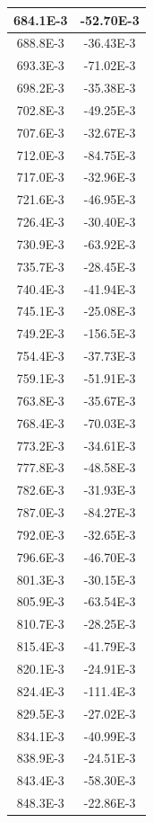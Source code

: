 \documentclass[english, 12pt, a4paper]{ifimaster}
\begin{document}
\begin{appendices}
\begin{center}
\begin{longtable}[htbp]{|c|c|}
\hline
  684.1E-3 & -52.70E-3 \\
\hline
  688.8E-3 & -36.43E-3 \\
\hline
  693.3E-3 & -71.02E-3 \\
\hline
  698.2E-3 & -35.38E-3 \\
\hline
  702.8E-3 & -49.25E-3 \\
\hline
  707.6E-3 & -32.67E-3 \\
\hline
  712.0E-3 & -84.75E-3 \\
\hline
  717.0E-3 & -32.96E-3 \\
\hline
  721.6E-3 & -46.95E-3 \\
\hline
  726.4E-3 & -30.40E-3 \\
\hline
  730.9E-3 & -63.92E-3 \\
\hline
  735.7E-3 & -28.45E-3 \\
\hline
  740.4E-3 & -41.94E-3 \\
\hline
  745.1E-3 & -25.08E-3 \\
\hline
  749.2E-3 & -156.5E-3 \\
\hline
  754.4E-3 & -37.73E-3 \\
\hline
  759.1E-3 & -51.91E-3 \\
\hline
  763.8E-3 & -35.67E-3 \\
\hline
  768.4E-3 & -70.03E-3 \\
\hline
  773.2E-3 & -34.61E-3 \\
\hline
  777.8E-3 & -48.58E-3 \\
\hline
  782.6E-3 & -31.93E-3 \\
\hline
  787.0E-3 & -84.27E-3 \\
\hline
  792.0E-3 & -32.65E-3 \\
\hline
  796.6E-3 & -46.70E-3 \\
\hline
  801.3E-3 & -30.15E-3 \\
\hline
  805.9E-3 & -63.54E-3 \\
\hline
  810.7E-3 & -28.25E-3 \\
\hline
  815.4E-3 & -41.79E-3 \\
\hline
  820.1E-3 & -24.91E-3 \\
\hline
  824.4E-3 & -111.4E-3 \\
\hline
  829.5E-3 & -27.02E-3 \\
\hline
  834.1E-3 & -40.99E-3 \\
\hline
  838.9E-3 & -24.51E-3 \\
\hline
  843.4E-3 & -58.30E-3 \\
\hline
  848.3E-3 & -22.86E-3 \\

\end{longtable}
\end{center}
\end{appendices}
\end{document}
